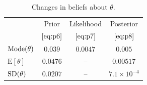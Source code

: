 \begin{table}[!h]
\bigskip

\begin{tabular}{|l|c|c|c|}
\cline{2-4}
\multicolumn{1}{c|}{~}& Prior & Likelihood & Posterior \\
\multicolumn{1}{c|}{~}& $\eqref{eq:p6}$ & $\eqref{eq:p7}$ & $\eqref{eq:p8}$ \\
\hline
$\textnormal{Mode}(\theta)$ & $0.039$ & $ 0.0047$ & $0.005$ \\
$\text{E}[\theta]$ & $0.0476$ & -- & $0.00517$ \\
$\textnormal{SD}(\theta)$ & $0.0207$ & -- & $7.1\times 10^{-4}$ \\
\hline
\end{tabular}
\caption{Changes in beliefs about $\theta$.}
\label{tab:clickthrough}

\end{table}

\clearpage

